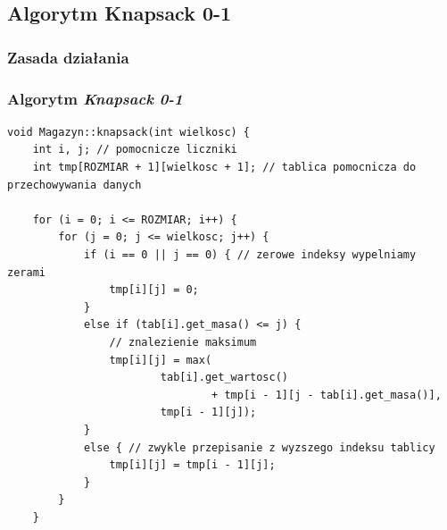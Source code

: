 \documentclass{beamer}
\begin{document}
\subsection{Algorytm Knapsack 0-1}
\begin{frame}
	\frametitle{Zasada działania}
	
\end{frame}

\begin{frame}[fragile]
	\frametitle{Algorytm \textit{Knapsack 0-1}}
	\begin{lstlisting}[basicstyle=\tiny,tabsize=2]
void Magazyn::knapsack(int wielkosc) {
	int i, j; // pomocnicze liczniki
	int tmp[ROZMIAR + 1][wielkosc + 1]; // tablica pomocnicza do przechowywania danych

	for (i = 0; i <= ROZMIAR; i++) {
		for (j = 0; j <= wielkosc; j++) {
			if (i == 0 || j == 0) { // zerowe indeksy wypelniamy zerami
				tmp[i][j] = 0;
			}
			else if (tab[i].get_masa() <= j) {
				// znalezienie maksimum
				tmp[i][j] = max(
						tab[i].get_wartosc()
								+ tmp[i - 1][j - tab[i].get_masa()],
						tmp[i - 1][j]);
			}
			else { // zwykle przepisanie z wyzszego indeksu tablicy
				tmp[i][j] = tmp[i - 1][j];
			}
		}
	}
	\end{lstlisting}
\end{frame}
\end{document}
